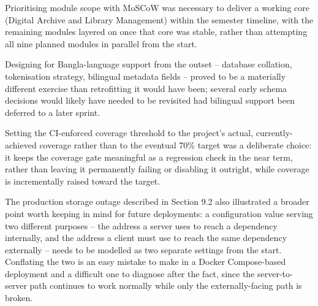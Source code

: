 \documentclass[12pt]{article}
\begin{document}
Prioritising module scope with MoSCoW was necessary to deliver a working core (Digital Archive and Library Management) within the semester timeline, with the remaining modules layered on once that core was stable, rather than attempting all nine planned modules in parallel from the start.

Designing for Bangla-language support from the outset -- database collation, tokenisation strategy, bilingual metadata fields -- proved to be a materially different exercise than retrofitting it would have been; several early schema decisions would likely have needed to be revisited had bilingual support been deferred to a later sprint.

Setting the CI-enforced coverage threshold to the project's actual, currently-achieved coverage rather than to the eventual 70\% target was a deliberate choice: it keeps the coverage gate meaningful as a regression check in the near term, rather than leaving it permanently failing or disabling it outright, while coverage is incrementally raised toward the target.

The production storage outage described in Section 9.2 also illustrated a broader point worth keeping in mind for future deployments: a configuration value serving two different purposes -- the address a server uses to reach a dependency internally, and the address a client must use to reach the same dependency externally -- needs to be modelled as two separate settings from the start. Conflating the two is an easy mistake to make in a Docker Compose-based deployment and a difficult one to diagnose after the fact, since the server-to-server path continues to work normally while only the externally-facing path is broken.
\end{document}
